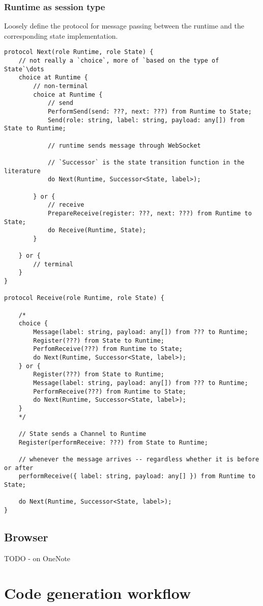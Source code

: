 \documentclass{article}
\begin{document}
\subsubsection{Runtime as session type}
Loosely define the protocol for message passing between the runtime and the
corresponding state implementation.

\begin{lstlisting}[breaklines=true, tabsize=4, frame=single]
protocol Next(role Runtime, role State) {
	// not really a `choice`, more of `based on the type of State`\dots
	choice at Runtime {
		// non-terminal
		choice at Runtime {
			// send
			PerformSend(send: ???, next: ???) from Runtime to State;
			Send(role: string, label: string, payload: any[]) from State to Runtime;
			
			// runtime sends message through WebSocket
			
			// `Successor` is the state transition function in the literature
			do Next(Runtime, Successor<State, label>);
			
		} or {
			// receive
			PrepareReceive(register: ???, next: ???) from Runtime to State;
			do Receive(Runtime, State);
		}
		
	} or {
		// terminal
	}
}

protocol Receive(role Runtime, role State) {
	
	/*
	choice {
		Message(label: string, payload: any[]) from ??? to Runtime;
		Register(???) from State to Runtime;
		PerfomReceive(???) from Runtime to State;
		do Next(Runtime, Successor<State, label>);
	} or {
		Register(???) from State to Runtime;
		Message(label: string, payload: any[]) from ??? to Runtime;
		PerformReceive(???) from Runtime to State;
		do Next(Runtime, Successor<State, label>); 
	}
	*/
	
	// State sends a Channel to Runtime
	Register(performReceive: ???) from State to Runtime;
	
	// whenever the message arrives -- regardless whether it is before or after
	performReceive({ label: string, payload: any[] }) from Runtime to State;
	
	do Next(Runtime, Successor<State, label>);
}
\end{lstlisting}

\subsection{Browser}

TODO - on OneNote

\section{Code generation workflow}
\end{document}
